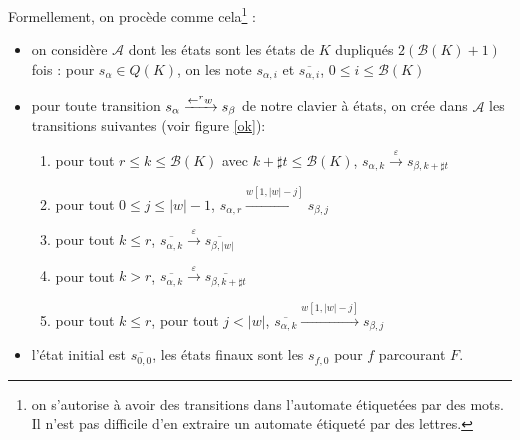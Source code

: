 \documentclass[12pt, a4paper]{article}
\renewcommand{\bar}{\overline}
\newcommand{\A}{\mathcal{A}}
\begin{document}
    Formellement, on procède comme cela\footnote{on s'autorise à avoir des transitions dans l'automate étiquetées par des mots. Il n'est pas difficile d'en extraire un automate étiqueté par des lettres.} :
        \begin{itemize}
        \item on considère $\A$ dont les états sont les états de $K$ dupliqués $2(\mathcal{B}(K) + 1)$ fois : pour $s_\alpha \in Q(K)$, on les note $s_{\alpha, i}$ et $\overline{s_{\alpha, i}}$, $0 \leqslant i \leqslant \mathcal{B}(K)$
        \item pour toute transition $s_{\alpha} \xrightarrow{\mathord{\leftarrow}^r w} s_{\beta}$ de notre clavier à états, on crée dans $\A$ les transitions suivantes (voir figure \ref{ok}):
            \begin{enumerate}
                \item pour tout $r \leqslant k \leqslant \mathcal{B}(K)$ avec $k + \sharp t \leqslant \mathcal{B}(K)$, $s_{\alpha, k} \xrightarrow{\varepsilon} s_{\beta, k + \sharp t}$
                \item pour tout $0 \leqslant j \leqslant |w| - 1$, $s_{\alpha, r} \xrightarrow{w[1,|w|-j]} s_{\beta, j}$
                \item pour tout $k \leqslant r$, $\overline{s_{\alpha,k}} \xrightarrow{\varepsilon} \overline{s_{\beta,|w|}}$
                \item pour tout $k > r$, $\overline{s_{\alpha,k}} \xrightarrow{\varepsilon} \overline{s_{\beta,k+\sharp t}}$
                \item pour tout $k \leqslant r$, pour tout $j < |w|$, $\overline{s_{\alpha,k}} \xrightarrow{w[1,|w|-j]} s_{\beta, j}$
            \end{enumerate} 
        \item l'état initial est $\overline{s_{0,0}}$, les états finaux sont les $s_{f,0}$ pour $f$ parcourant $F$.
    \end{itemize}
\end{document}
